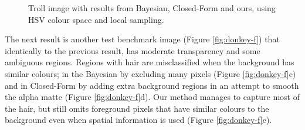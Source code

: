 \begin{figure}[t!]
\newline
{}
\caption[Troll benchmark image with various results.]{Troll image with results from Bayesian, Closed-Form and ours, using HSV colour space and local sampling.}
\label{fig:troll-f}
\end{figure}

The next result is another test benchmark image (Figure \ref{fig:donkey-f}) that identically to the previous result, has moderate transparency and some ambiguous regions. Regions with hair are misclassified when the background has similar colours; in the Bayesian by excluding many pixels (Figure \ref{fig:donkey-f}c) and in Closed-Form by adding extra background regions in an attempt to smooth the alpha matte (Figure \ref{fig:donkey-f}d). Our method manages to capture most of the hair, but still omits foreground pixels that have similar colours to the background even when spatial information is used (Figure \ref{fig:donkey-f}e).

